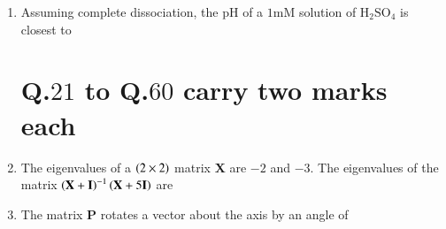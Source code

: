 \documentclass[journal,12pt,onecolumn]{IEEEtran}
\theoremstyle{remark}
\begin{document}
\begin{enumerate}
 
\item Assuming complete dissociation, the pH of a $1\text{mM}$ solution of $\mathrm{H_2SO_4}$ is closest to \par \hfill{}
\begin{enumerate}
\end{enumerate}

 

\section*{\textbf{Q.$21$ to Q.$60$ carry two marks each}}

 
\item The eigenvalues of a $\left(2\times2\right)$ matrix \textbf{X} are $-2$ and $-3$. The eigenvalues of the matrix $\left(\textbf{X}+\textbf{I}\right)^{-1}\left(\textbf{X}+5\textbf{I}\right)$ are \par \hfill{}
\begin{enumerate} 
\end{enumerate}

 
\item The matrix \textbf{P} 
 rotates a vector about the axis  by an angle of \par \hfill{}
\begin{enumerate}
\end{enumerate}


\end{enumerate}
\end{document}
